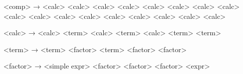 <comp>           → <calc> \lit{>} <calc>
                 \alt <calc> \lit{\textless} <calc>
                 \alt <calc> \lit{>=} <calc>
                 \alt <calc> \lit{\textless=} <calc>
                 \alt <calc>  <calc>
                 \alt <calc>  <calc>
                 \alt <calc>  <calc>
                 \alt <calc>  <calc>
                 \alt <calc>

<calc>           → <calc> \lit{+} <term>
                 \alt <calc> \lit{-} <term>
                 \alt <calc>  <term>
                 \alt <term>

<term>           → <term> \lit{*} <factor>
                 \alt <term> \lit{/} <factor>
                 \alt <factor>

<factor>         → <simple expr>
                 \alt \lit{!} <factor>
                 \alt \lit{+} <factor>
                 \alt \lit{-} <factor>
                 \alt \lit{(} <expr> \lit{)}
